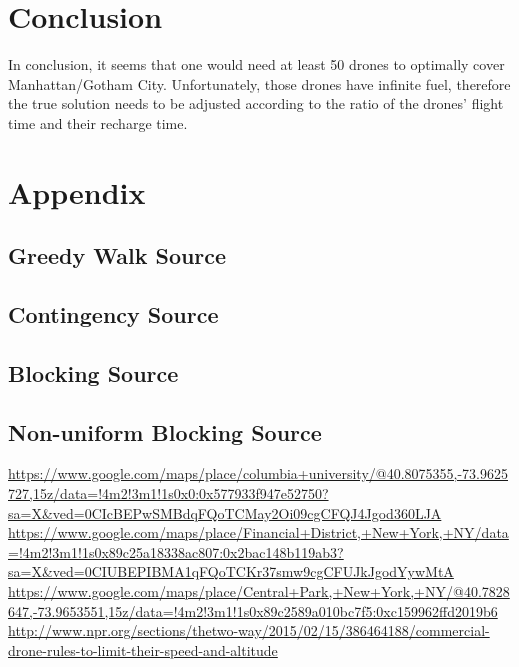 \documentclass{article}
\begin{document}
\section{Conclusion}
\label{sec:conclusion}
In conclusion, it seems that one would need at least 50 drones to optimally cover Manhattan/Gotham City. Unfortunately, those drones have infinite fuel, therefore the true solution needs to be adjusted according to the ratio of the drones' flight time and their recharge time.


\section{Appendix}
\label{sec:appendix}

\subsection{Greedy Walk Source}
\label{sub:greedy_walk_source}



\subsection{Contingency Source}
\label{sub:contingency_source}


\subsection{Blocking Source}
\label{sub:blocking_source}



\subsection{Non-uniform Blocking Source}
\label{sub:fk}






\begin{thebibliography}{9}
    \url{https://www.google.com/maps/place/columbia+university/@40.8075355,-73.9625727,15z/data=!4m2!3m1!1s0x0:0x577933f947e52750?sa=X&ved=0CIcBEPwSMBdqFQoTCMay2Oi09cgCFQJ4Jgod360LJA}
    \url{https://www.google.com/maps/place/Financial+District,+New+York,+NY/data=!4m2!3m1!1s0x89c25a18338ac807:0x2bac148b119ab3?sa=X&ved=0CIUBEPIBMA1qFQoTCKr37smw9cgCFUJkJgodYywMtA}
    \url{https://www.google.com/maps/place/Central+Park,+New+York,+NY/@40.7828647,-73.9653551,15z/data=!4m2!3m1!1s0x89c2589a010bc7f5:0xc159962ffd2019b6}
    \url{http://www.npr.org/sections/thetwo-way/2015/02/15/386464188/commercial-drone-rules-to-limit-their-speed-and-altitude}
\end{thebibliography}
\end{document}
